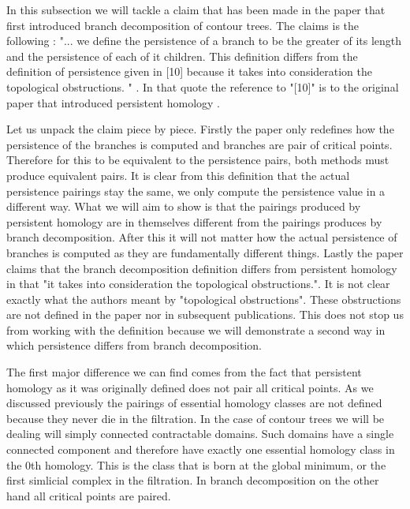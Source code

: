In this subsection we will tackle a claim that has been made in the paper that first introduced branch decomposition of contour trees. The claims is the following : "... we define the persistence of a branch to be the greater of its length and the persistence of each of it children. This definition differs from the definition of persistence given in [10] because it takes into consideration the topological obstructions. " \cite{ct-branch-decomp}. In that quote the reference to "[10]" is to the original paper that introduced persistent homology \cite{persistence-original}.

Let us unpack the claim piece by piece. Firstly the paper only redefines how the persistence of the branches is computed and branches are pair of critical points. Therefore for this to be equivalent to the persistence pairs, both methods must  produce equivalent pairs. It is clear from this definition that the actual persistence pairings stay the same, we only compute the persistence value in a different way. What we will aim to show is that the pairings produced by persistent homology are in themselves different from the pairings produces by branch decomposition. After this it will not matter how the actual persistence of branches is computed as they are fundamentally different things. Lastly the paper claims that the branch decomposition definition differs from persistent homology in that "it takes into consideration the topological obstructions.". It is not clear exactly what the authors meant by "topological obstructions". These obstructions are not defined in the paper nor in subsequent publications. This does not stop us from working with the definition because we will demonstrate a second way in which persistence differs from branch decomposition.

The first major difference we can find comes from the fact that persistent homology as it was originally defined does not pair all critical points. As we discussed previously the pairings of essential homology classes are not defined because they never die in the filtration. In the case of contour trees we will be dealing will simply connected contractable domains. Such domains have a single connected component and therefore have exactly one essential homology class in the 0th homology. This is the class that is born at the global minimum, or the first simlicial complex in the filtration. In branch decomposition on the other hand all critical points are paired.

